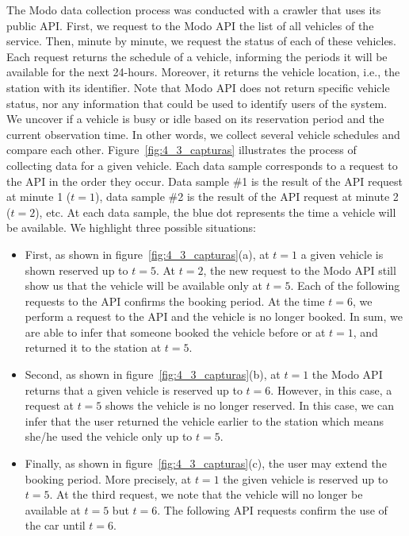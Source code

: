 The Modo data collection process was conducted with a crawler that uses its public API. 
First, we request to the Modo API the list of all vehicles of the service. 
Then, minute by minute, we request the status of each of these vehicles. Each request returns the schedule of a vehicle, informing the periods it will be available for the next 24-hours. Moreover, it returns the vehicle location, i.e., the station with its identifier. 
Note that Modo API does not return specific vehicle status, nor any information that could be used to identify users of the system. We uncover if a vehicle is busy or idle based on its reservation period and the current observation time. In other words, we collect several vehicle schedules and compare each other. Figure~\ref{fig:4_3_capturas} illustrates the process of collecting data for a given vehicle. Each data sample corresponds to a request to the API in the order they occur. Data sample \#1 is the result of the API request at minute 1 ($t=1$), data sample \#2 is the result of the API request at minute 2 ($t=2$), etc. At each data sample, the blue dot represents the time a vehicle will be available. We highlight three possible situations:

\begin{itemize}
\item First, as shown in figure~\ref{fig:4_3_capturas}(a), at $t=1$ a given vehicle is shown reserved up to $t=5$.  At $t=2$, the new request to the Modo API still show us that the vehicle will be available only at $t=5$. Each of the following requests to the API confirms the booking period. At the time $t=6$, we perform a request to the API and the vehicle is no longer booked. In sum, we are able to infer that someone booked the vehicle before or at $t=1$, and returned it to the station at $t=5$.

\item Second, as shown in figure~\ref{fig:4_3_capturas}(b), at $t=1$  the Modo API returns that a given vehicle is reserved up to $t=6$.  However, in this case, a request at $t=5$ shows the vehicle is no longer reserved. In this case, we can infer that the user returned the vehicle earlier to the station which means she/he used the vehicle only up to $t=5$.

\item Finally, as shown in figure~\ref{fig:4_3_capturas}(c), the user may extend the booking period. More precisely, at $t=1$ the given vehicle is reserved up to $t=5$. At the third request, we note that the vehicle will no longer be available at $t=5$ but $t=6$. The following API requests confirm the use of the car until $t=6$.
\end{itemize}


